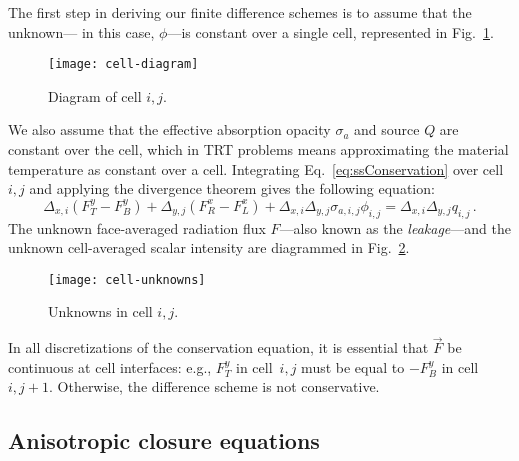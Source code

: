 The first step in deriving our finite difference schemes is to assume that the
unknown---%
in this case, $\phi$---is constant over a single cell, represented in
Fig.~\ref{fig:cellDiagram}. 
%
\begin{figure}[tb]
  \centering
  \texttt{[image: cell-diagram]}
  \caption{Diagram of cell $i,j$.}
  \label{fig:cellDiagram}
\end{figure}
%
We also assume that the effective absorption opacity $\sigma_a$ and source $Q$
are
constant over the cell, which in TRT problems  means approximating the material
temperature as constant over a cell. Integrating Eq.~\eqref{eq:ssConservation} over cell
$i,j$ and applying the divergence theorem gives the following equation:
\begin{equation} \label{eq:ssConservationDisc}
  \Delta_{x,i} \left( F_T^y - F_B^y \right)
+ \Delta_{y,j} \left( F_R^x - F_L^x \right)
+ \Delta_{x,i}\Delta_{y,j} \sigma_{a,i,j} \phi_{i,j}
= \Delta_{x,i}\Delta_{y,j} q_{i,j}\,.
\end{equation}
The unknown face-averaged radiation flux $F$---also known as the
\emph{leakage}---and the
unknown cell-averaged scalar intensity are diagrammed in
Fig.~\ref{fig:cellUnknowns}.
%
\begin{figure}[htb]
  \centering
  \texttt{[image: cell-unknowns]}
  \caption{Unknowns in cell $i,j$.}
  \label{fig:cellUnknowns}
\end{figure}

In all discretizations of the conservation equation, it is
essential that
$\vec{F}$ be continuous at cell interfaces: e.g., $F_T^y$ in cell~$i,j$ must
be equal to $-F_B^y$ in cell~$i,{j+1}$. Otherwise, the difference scheme is not
conservative.

\subsection{Anisotropic closure equations}

